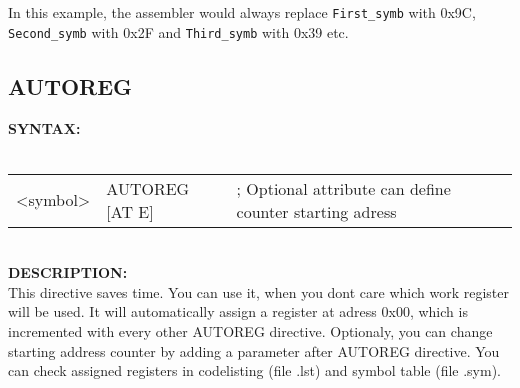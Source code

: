            In this example, the assembler would always replace {\color{highlight_symbol}\verb'First_symb'} with 0x9C,
            {\color{highlight_symbol}\verb'Second_symb'} with 0x2F and {\color{highlight_symbol}\verb'Third_symb'} with 0x39 etc.


                \subsection{AUTOREG}
                \textbf{SYNTAX:}\\
                        \\ {
                                \texttt{}
                                \begin{tabular}[h!]{llll}
                                { \color{highlight_symbol} <symbol> }  &
                                { \color{highlight_directive} AUTOREG }
                                { \color{highlight_constant} [AT E] } & { \color{highlight_comment} ; Optional attribute can define
                                                                                                    counter starting adress }\\
                                \end{tabular}
                        }
                        \\

                \textbf{DESCRIPTION:}\\
                This directive saves time. You can use it, when you dont care which work register will be used. It will automatically assign a register
                at adress 0x00, which is incremented with every other AUTOREG directive. Optionaly, you can change starting address counter by adding a parameter
                after AUTOREG directive. You can check assigned registers in codelisting (file .lst) and symbol table (file .sym).

